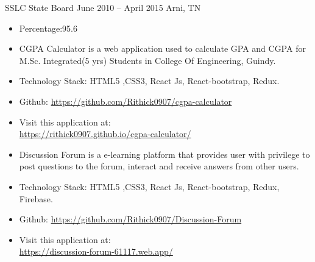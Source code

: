 \documentclass[10pt,a4paper,ragged2e]{altacv}
\begin{document}
\divider

{SSLC State Board}
{ June 2010 -- April 2015}
{Arni, TN}
\begin{itemize}
\item Percentage:95.6\\
\end{itemize}

\vspace{0.5cm}

\vspace{0.5cm}


\vspace{0.3cm}
\begin{itemize}
\item CGPA Calculator is a web application used to calculate GPA and CGPA for M.Sc. Integrated(5 yrs) Students in College Of Engineering, Guindy.  
\item Technology Stack: HTML5 ,CSS3, React Js, React-bootstrap, Redux.
\item Github:
\url{https://github.com/Rithick0907/cgpa-calculator}
\item Visit this application at: \\
\url{https://rithick0907.github.io/cgpa-calculator/}
\end{itemize}

\vspace{0.4cm}
\begin{itemize}
\item Discussion Forum is a e-learning platform that provides user with privilege to post questions to the forum, interact and receive answers from other users.
\item Technology Stack: HTML5 ,CSS3, React Js, React-bootstrap, Redux, Firebase.
\item Github:
\url{https://github.com/Rithick0907/Discussion-Forum}
\item Visit this application at: \\
\url{https://discussion-forum-61117.web.app/}
\end{itemize}
\smallskip
\end{document}
